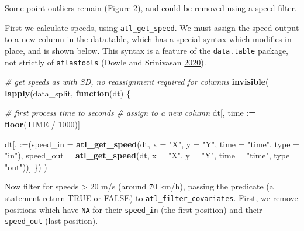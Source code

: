 \documentclass[
]{scrartcl}
\newenvironment{Shaded}{}{}
\newcommand{\CommentTok}[1]{\textcolor[rgb]{0.38,0.63,0.69}{\textit{#1}}}
\newcommand{\ControlFlowTok}[1]{\textcolor[rgb]{0.00,0.44,0.13}{\textbf{#1}}}
\newcommand{\DataTypeTok}[1]{\textcolor[rgb]{0.56,0.13,0.00}{#1}}
\newcommand{\DecValTok}[1]{\textcolor[rgb]{0.25,0.63,0.44}{#1}}
\newcommand{\ErrorTok}[1]{\textcolor[rgb]{1.00,0.00,0.00}{\textbf{#1}}}
\newcommand{\KeywordTok}[1]{\textcolor[rgb]{0.00,0.44,0.13}{\textbf{#1}}}
\newcommand{\NormalTok}[1]{#1}
\newcommand{\OperatorTok}[1]{\textcolor[rgb]{0.40,0.40,0.40}{#1}}
\newcommand{\StringTok}[1]{\textcolor[rgb]{0.25,0.44,0.63}{#1}}
\begin{document}
Some point outliers remain (Figure 2), and could be removed using a speed filter.

First we calculate speeds, using \texttt{atl\_get\_speed}. We must assign the speed output to a new column in the data.table, which has a special syntax which modifies in place, and is shown below. This syntax is a feature of the \texttt{data.table} package, not strictly of \texttt{atlastools} (Dowle and Srinivasan \protect\hyperlink{ref-dowle2020}{2020}).

\begin{Shaded}
\begin{Highlighting}[]
\CommentTok{\# get speeds as with SD, no reassignment required for columns}
\KeywordTok{invisible}\NormalTok{(}
  \KeywordTok{lapply}\NormalTok{(data\_split, }\ControlFlowTok{function}\NormalTok{(dt) \{}
    
    \CommentTok{\# first process time to seconds}
    \CommentTok{\# assign to a new column}
\NormalTok{    dt[, time }\OperatorTok{:}\ErrorTok{=}\StringTok{ }\KeywordTok{floor}\NormalTok{(TIME }\OperatorTok{/}\StringTok{ }\DecValTok{1000}\NormalTok{)]}
    
\NormalTok{    dt[, }\StringTok{\textasciigrave{}}\DataTypeTok{:=}\StringTok{\textasciigrave{}}\NormalTok{(}\DataTypeTok{speed\_in =} \KeywordTok{atl\_get\_speed}\NormalTok{(dt, }
                                       \DataTypeTok{x =} \StringTok{"X"}\NormalTok{, }\DataTypeTok{y =} \StringTok{"Y"}\NormalTok{, }
                                       \DataTypeTok{time =} \StringTok{"time"}\NormalTok{,}
                                       \DataTypeTok{type =} \StringTok{"in"}\NormalTok{),}
              \DataTypeTok{speed\_out =} \KeywordTok{atl\_get\_speed}\NormalTok{(dt, }
                                       \DataTypeTok{x =} \StringTok{"X"}\NormalTok{, }\DataTypeTok{y =} \StringTok{"Y"}\NormalTok{, }
                                       \DataTypeTok{time =} \StringTok{"time"}\NormalTok{,}
                                       \DataTypeTok{type =} \StringTok{"out"}\NormalTok{))]}
\NormalTok{  \})}
\NormalTok{)}
\end{Highlighting}
\end{Shaded}

Now filter for speeds \textgreater{} 20 m/s (around 70 km/h), passing the predicate (a statement return TRUE or FALSE) to \texttt{atl\_filter\_covariates}. First, we remove positions which have \texttt{NA} for their \texttt{speed\_in} (the first position) and their \texttt{speed\_out} (last position).
\end{document}
